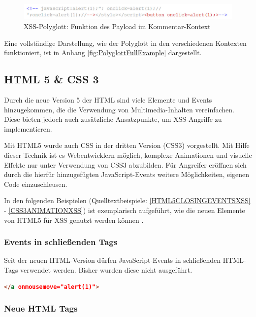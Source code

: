 		\begin{figure}[htbp] 
			\centering
			\includegraphics[width=\textwidth]{contents/images/PolyglottSingleExample2}
			\caption{XSS-Polyglott: Funktion des Payload im Kommentar-Kontext}
			\label{fig:PolyglottSingleExample2}
		\end{figure}
		
		Eine vollständige Darstellung, wie der Polyglott in den verschiedenen Kontexten funktioniert, ist in Anhang \ref{fig:PolyglottFullExample} dargestellt.
		
\subsection{\acl{HTML} 5 \& \acl{CSS} 3}
		Durch die neue Version 5 der \acl{HTML} sind viele Elemente und Events hinzugekommen, die die Verwendung von Multimedia-Inhalten vereinfachen. Diese bieten jedoch auch zusätzliche Ansatzpunkte, um XSS-Angriffe zu implementieren. 
		
		Mit HTML5 wurde auch \ac{CSS} in der dritten Version (\ac{CSS}3) vorgestellt. Mit Hilfe dieser Technik ist es Webentwicklern möglich, komplexe Animationen und visuelle Effekte nur unter Verwendung von \ac{CSS}3 abzubilden. Für Angreifer eröffnen sich durch die hierfür hinzugefügten JavaScript-Events weitere Möglichkeiten, eigenen Code einzuschleusen.		
		
		\noindent In den folgenden Beispielen (Quelltextbeispiele: \ref{HTML5CLOSINGEVENTSXSS} - \ref{CSS3ANIMATIONXSS}) ist exemplarisch aufgeführt, wie die neuen Elemente von HTML5 für \ac{XSS} genutzt werden können \cite{HTML5Sec2017}. 
		
\subsubsection{Events in schließenden Tags}
		
		Seit der neuen HTML-Version dürfen JavaScript-Events in schließenden HTML-Tags verwendet werden. Bisher wurden diese nicht ausgeführt.
		
\begin{lstlisting}[language=HTML,caption={XSS-Angriffe: Eventhandler in schließenden HTML-Tags},label=HTML5CLOSINGEVENTSXSS]
</a onmousemove="alert(1)">
\end{lstlisting}
		
\subsubsection{Neue HTML Tags}
		

